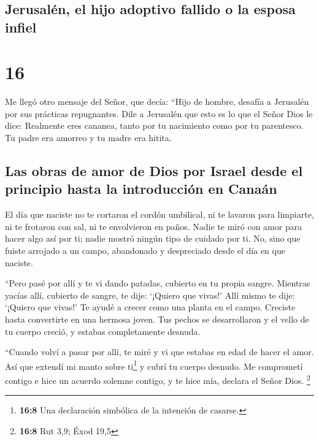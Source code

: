 \hypertarget{jerusaluxe9n-el-hijo-adoptivo-fallido-o-la-esposa-infiel}{%
\subsection{Jerusalén, el hijo adoptivo fallido o la esposa
infiel}\label{jerusaluxe9n-el-hijo-adoptivo-fallido-o-la-esposa-infiel}}

\hypertarget{section-15}{%
\section{16}\label{section-15}}

 Me llegó otro mensaje del Señor, que decía:
 ``Hijo de hombre, desafía a Jerusalén por sus prácticas
repugnantes.  Dile a Jerusalén que esto es lo que el Señor
Dios le dice: Realmente eres cananea, tanto por tu nacimiento como por
tu parentesco. Tu padre era amorreo y tu madre era hitita.

\hypertarget{las-obras-de-amor-de-dios-por-israel-desde-el-principio-hasta-la-introducciuxf3n-en-canauxe1n}{%
\subsection{Las obras de amor de Dios por Israel desde el principio
hasta la introducción en
Canaán}\label{las-obras-de-amor-de-dios-por-israel-desde-el-principio-hasta-la-introducciuxf3n-en-canauxe1n}}

 El día que naciste no te cortaron el cordón umbilical, ni
te lavaron para limpiarte, ni te frotaron con sal, ni te envolvieron en
paños.  Nadie te miró con amor para hacer algo así por ti;
nadie mostró ningún tipo de cuidado por ti. No, sino que fuiste arrojado
a un campo, abandonado y despreciado desde el día en que naciste.

 ``Pero pasé por allí y te vi dando patadas, cubierto en
tu propia sangre. Mientras yacías allí, cubierto de sangre, te dije:
`¡Quiero que vivas!' Allí mismo te dije: `¡Quiero que vivas!'
 Te ayudé a crecer como una planta en el campo. Creciste
hasta convertirte en una hermosa joven. Tus pechos se desarrollaron y el
vello de tu cuerpo creció, y estabas completamente desnuda.

 ``Cuando volví a pasar por allí, te miré y vi que estabas
en edad de hacer el amor. Así que extendí mi manto sobre ti\footnote{\textbf{16:8}
  Una declaración simbólica de la intención de casarse.} y cubrí tu
cuerpo desnudo. Me comprometí contigo e hice un acuerdo solemne contigo,
y te hice mía, declara el Señor Dios. \footnote{\textbf{16:8} Rut 3,9;
  Éxod 19,5}

